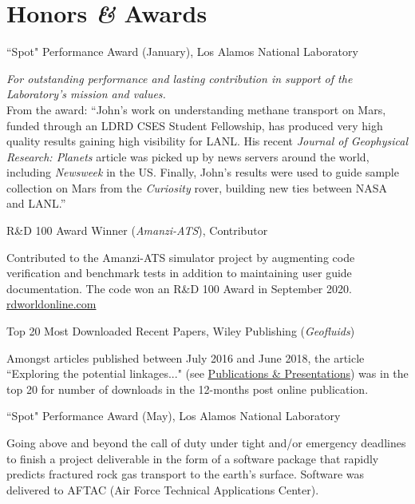 \documentclass[11pt, letterpaper]{article}
\newcommand{\amper}{{\fontspec[Scale=.95]{Adobe Caslon Pro}\selectfont\itshape\&}}
\newcommand{\years}[1]{\marginnote{\scriptsize #1}}
\begin{document}
\section*{Honors \amper{} Awards}
\label{sec:awards}  %
\noindent
\years{2024}“Spot" Performance Award (January), Los Alamos National Laboratory
\begin{adjustwidth}{5pt}{0pt}
    \emph{For outstanding performance and lasting contribution in support of the
    Laboratory's mission and values.}\\
    From the award:
    ``John's work on understanding methane transport on Mars, funded through an
    LDRD CSES Student Fellowship, has produced very high quality results
    gaining high visibility for LANL. His recent \textit{Journal of Geophysical
    Research: Planets} article was picked up by news servers around the world,
    including \textit{Newsweek} in the US. Finally, John's results were used to
    guide sample collection on Mars from the \textit{Curiosity} rover, building
    new ties between NASA and LANL.''
\end{adjustwidth}

\years{2020}R\&D 100 Award Winner (\emph{Amanzi-ATS}), Contributor
\begin{adjustwidth}{5pt}{0pt}
	Contributed to the Amanzi-ATS simulator project by augmenting code
	verification and benchmark tests in addition to maintaining user guide
	documentation. The code won an R\&D 100 Award in September 2020. 
	\href{https://www.rdworldonline.com/rd-100-award-winners-announced-in-mechanical-materials-category/}{rdworldonline.com}
\end{adjustwidth}

\years{2018}Top 20 Most Downloaded Recent Papers, Wiley Publishing (\emph{Geofluids})
\begin{adjustwidth}{5pt}{0pt}
	Amongst articles published between July 2016 and June 2018, the article
	``Exploring the potential linkages..." (see
	\hyperref[sec:pubs]{Publications \& Presentations}) was in the top 20 for
	number of downloads in the 12-months post online publication.
\end{adjustwidth}

\years{2018}“Spot" Performance Award (May), Los Alamos National Laboratory
\begin{adjustwidth}{5pt}{0pt}
    Going above and beyond the call of duty under tight and/or emergency
    deadlines to finish a project deliverable in the form of a software package
    that rapidly predicts fractured rock gas transport to the earth's surface.
    Software was delivered to AFTAC (Air Force Technical Applications Center).
\end{adjustwidth}
\end{document}
